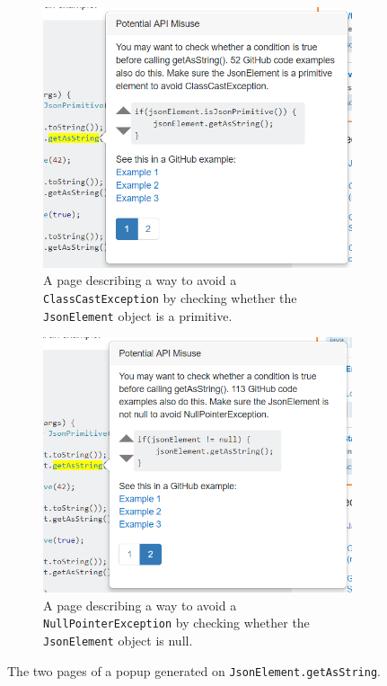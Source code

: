 \begin{figure}
\centering
  \begin{subfigure}[a]{0.48\textwidth}
  \includegraphics[width=\textwidth]{json_ex2.PNG}
  \caption{A page describing a way to avoid a {\tt ClassCastException} by checking whether the {\tt JsonElement} object is a primitive.} 
  \vspace{.1in}
  \label{fig:arch}
  \end{subfigure}
  \hfill
  \begin{subfigure}[b]{0.48\textwidth}
  \includegraphics[width=\textwidth]{json_ex3.PNG}
  \caption{A page describing a way to avoid a {\tt NullPointerException} by checking whether the {\tt JsonElement} object is null.}
  \vspace{.1in}
  \label{fig:arch}
  \end{subfigure}
  \hfill
\caption{The two pages of a popup generated on {\tt JsonElement.getAsString}.}
\end{figure}

